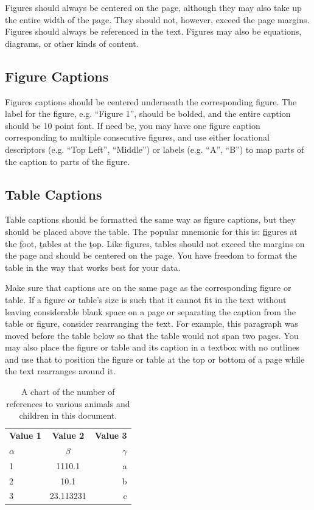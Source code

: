 {{{{Figures should always be centered on the page, although they may also take up
the entire width of the page. They should not, however, exceed the page margins.
Figures should always be referenced in the text. Figures may also be equations,
diagrams, or other kinds of content.

\subsection*{Figure Captions}
Figures captions should be centered underneath the corresponding figure. The
label for the figure, e.g. ``Figure 1'', should be bolded, and the entire
caption should be 10 point font. If need be, you may have one figure caption
corresponding to multiple consecutive figures, and use either locational
descriptors (e.g. ``Top Left'', ``Middle'') or labels (e.g. ``A'', ``B'') to map
parts of the caption to parts of the figure.

\subsection*{Table Captions}
Table captions should be formatted the same way as figure captions, but they
should be placed above the table. The popular mnemonic for this is:
\underline{f}igures at the \underline{f}oot, \underline{t}ables at the
\underline{t}op. Like figures, tables should not exceed the margins on the page
and should be centered on the page. You have freedom to format the table in the
way that works best for your data.

Make sure that captions are on the same page as the corresponding figure or
table. If a figure or table's size is such that it cannot fit in the text
without leaving considerable blank space on a page or separating the caption
from the table or figure, consider rearranging the text. For example, this
paragraph was moved before the table below so that the table would not span two
pages. You may also place the figure or table and its caption in a textbox with
no outlines and use that to position the figure or table at the top or bottom of
a page while the text rearranges around it.

\begin{table}[H]
  \centering
  \caption{A chart of the number of references to various animals and children in this document.}
  \label{table:1}
  \begin{tabular}{l|c|r}
    \textbf{Value 1} & \textbf{Value 2} & \textbf{Value 3}\\
    $\alpha$ & $\beta$ & $\gamma$ \\
    \hline
    1 & 1110.1 & a\\
    2 & 10.1 & b\\
    3 & 23.113231 & c\\
  \end{tabular}
\end{table}

}}}}
